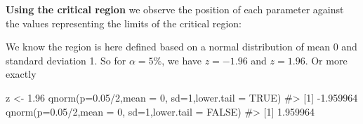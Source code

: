 \documentclass[
  letterpaper,
  DIV=11,
  numbers=noendperiod]{scrreprt}
\newenvironment{Shaded}{\begin{snugshade}}{\end{snugshade}}
\newcommand{\AttributeTok}[1]{\textcolor[rgb]{0.40,0.45,0.13}{#1}}
\newcommand{\CommentTok}[1]{\textcolor[rgb]{0.37,0.37,0.37}{#1}}
\newcommand{\ConstantTok}[1]{\textcolor[rgb]{0.56,0.35,0.01}{#1}}
\newcommand{\DecValTok}[1]{\textcolor[rgb]{0.68,0.00,0.00}{#1}}
\newcommand{\FloatTok}[1]{\textcolor[rgb]{0.68,0.00,0.00}{#1}}
\newcommand{\FunctionTok}[1]{\textcolor[rgb]{0.28,0.35,0.67}{#1}}
\newcommand{\NormalTok}[1]{\textcolor[rgb]{0.00,0.23,0.31}{#1}}
\newcommand{\OtherTok}[1]{\textcolor[rgb]{0.00,0.23,0.31}{#1}}
\newcommand{\SpecialCharTok}[1]{\textcolor[rgb]{0.37,0.37,0.37}{#1}}
\begin{document}
\textbf{Using the critical region} we observe the position of each
parameter against the values representing the limits of the critical
region:

We know the region is here defined based on a normal distribution of
mean 0 and standard deviation 1. So for \(\alpha = 5\%\), we have
\(z=-1.96\) and \(z=1.96\). Or more exactly

\begin{Shaded}
\begin{Highlighting}[]
\NormalTok{z }\OtherTok{\textless{}{-}} \FloatTok{1.96}
\FunctionTok{qnorm}\NormalTok{(}\AttributeTok{p=}\FloatTok{0.05}\SpecialCharTok{/}\DecValTok{2}\NormalTok{,}\AttributeTok{mean =} \DecValTok{0}\NormalTok{, }\AttributeTok{sd=}\DecValTok{1}\NormalTok{,}\AttributeTok{lower.tail =} \ConstantTok{TRUE}\NormalTok{)}
\CommentTok{\#\textgreater{} [1] {-}1.959964}
\FunctionTok{qnorm}\NormalTok{(}\AttributeTok{p=}\FloatTok{0.05}\SpecialCharTok{/}\DecValTok{2}\NormalTok{,}\AttributeTok{mean =} \DecValTok{0}\NormalTok{, }\AttributeTok{sd=}\DecValTok{1}\NormalTok{,}\AttributeTok{lower.tail =} \ConstantTok{FALSE}\NormalTok{)}
\CommentTok{\#\textgreater{} [1] 1.959964}
\end{Highlighting}
\end{Shaded}
\end{document}
